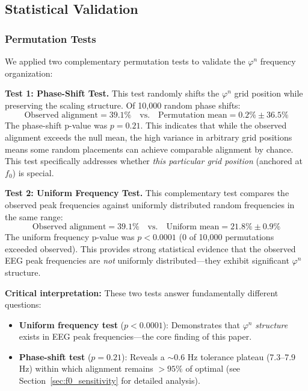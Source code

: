 \documentclass[11pt,a4paper]{article}
\newcommand{\phisym}{\varphi}
\newcommand{\fzero}{f_0}
\begin{document}
\subsection{Statistical Validation}

\subsubsection{Permutation Tests}
We applied two complementary permutation tests to validate the $\phisym^n$ frequency organization:

\textbf{Test 1: Phase-Shift Test.} This test randomly shifts the $\phisym^n$ grid position while preserving the scaling structure. Of 10,000 random phase shifts:
\begin{equation}
\text{Observed alignment} = 39.1\% \quad \text{vs.} \quad \text{Permutation mean} = 0.2\% \pm 36.5\%
\end{equation}
The phase-shift p-value was $p = 0.21$. This indicates that while the observed alignment exceeds the null mean, the high variance in arbitrary grid positions means some random placements can achieve comparable alignment by chance. This test specifically addresses whether \textit{this particular grid position} (anchored at $\fzero$) is special.

\textbf{Test 2: Uniform Frequency Test.} This complementary test compares the observed peak frequencies against uniformly distributed random frequencies in the same range:
\begin{equation}
\text{Observed alignment} = 39.1\% \quad \text{vs.} \quad \text{Uniform mean} = 21.8\% \pm 0.9\%
\end{equation}
The uniform frequency p-value was $p < 0.0001$ (0 of 10,000 permutations exceeded observed). This provides strong statistical evidence that the observed EEG peak frequencies are \textit{not} uniformly distributed---they exhibit significant $\phisym^n$ structure.

\textbf{Critical interpretation:} These two tests answer fundamentally different questions:
\begin{itemize}
    \item \textbf{Uniform frequency test} ($p < 0.0001$): Demonstrates that $\phisym^n$ \textit{structure} exists in EEG peak frequencies---the core finding of this paper.
    \item \textbf{Phase-shift test} ($p = 0.21$): Reveals a $\sim$0.6 Hz tolerance plateau (7.3--7.9 Hz) within which alignment remains $>95\%$ of optimal (see Section~\ref{sec:f0_sensitivity} for detailed analysis).
\end{itemize}
\end{document}
